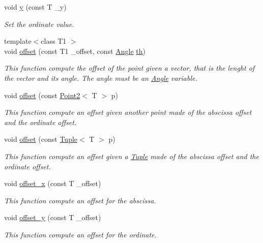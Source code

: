 \begin{DoxyCompactItemize}
void \mbox{\hyperlink{class_point2_a967025762c1b4dede5eb822f5c29522e}{y}} (const T \+\_\+y)
\begin{DoxyCompactList}\small\item\em Set the ordinate value. \end{DoxyCompactList}\item 
{\footnotesize template$<$class T1 $>$ }\\void \mbox{\hyperlink{class_point2_ae55da7a4bd7fe7491ebc0134a39bb791}{offset}} (const T1 \+\_\+offset, const \mbox{\hyperlink{class_angle}{Angle}} \mbox{\hyperlink{class_point2_a0ef2bb867cce9a4f184f00af809bc766}{th}})
\begin{DoxyCompactList}\small\item\em This function compute the offset of the point given a vector, that is the lenght of the vector and its angle. The angle must be an {\ttfamily \mbox{\hyperlink{class_angle}{Angle}}} variable. \end{DoxyCompactList}\item 
void \mbox{\hyperlink{class_point2_ac171989ec252c36ce6253916269186f8}{offset}} (const \mbox{\hyperlink{class_point2}{Point2}}$<$ T $>$ p)
\begin{DoxyCompactList}\small\item\em This function compute an offset given another point made of the abscissa offset and the ordinate offset. \end{DoxyCompactList}\item 
void \mbox{\hyperlink{class_point2_aaa05b71e25db64c365fe2377d4f3f812}{offset}} (const \mbox{\hyperlink{class_tuple}{Tuple}}$<$ T $>$ p)
\begin{DoxyCompactList}\small\item\em This function compute an offset given a {\ttfamily \mbox{\hyperlink{class_tuple}{Tuple}}} made of the abscissa offset and the ordinate offset. \end{DoxyCompactList}\item 
void \mbox{\hyperlink{class_point2_a24d1c6e9487f0baa48543b0fa1c87906}{offset\+\_\+x}} (const T \+\_\+offset)
\begin{DoxyCompactList}\small\item\em This function compute an offset for the abscissa. \end{DoxyCompactList}\item 
void \mbox{\hyperlink{class_point2_a847590c808b59b824ac3c0044544ab6b}{offset\+\_\+y}} (const T \+\_\+offset)
\begin{DoxyCompactList}\small\item\em This function compute an offset for the ordinate. \end{DoxyCompactList}\item 

\end{DoxyCompactItemize}
